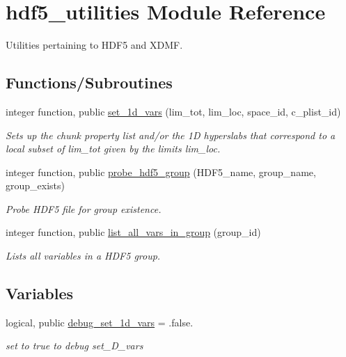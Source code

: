 \hypertarget{namespacehdf5__utilities}{}\section{hdf5\+\_\+utilities Module Reference}
\label{namespacehdf5__utilities}


Utilities pertaining to H\+D\+F5 and X\+D\+MF.  


\subsection*{Functions/\+Subroutines}
\begin{DoxyCompactItemize}
\item 
integer function, public \hyperlink{namespacehdf5__utilities_a7574320980affc30a584f7776d33a51c}{set\+\_\+1d\+\_\+vars} (lim\+\_\+tot, lim\+\_\+loc, space\+\_\+id, c\+\_\+plist\+\_\+id)
\begin{DoxyCompactList}\small\item\em Sets up the chunk property list and/or the 1D hyperslabs that correspond to a local subset of {\ttfamily lim\+\_\+tot} given by the limits {\ttfamily lim\+\_\+loc}. \end{DoxyCompactList}\item 
integer function, public \hyperlink{namespacehdf5__utilities_ae4e6c96512460a0ede8dc5b1a43681e8}{probe\+\_\+hdf5\+\_\+group} (H\+D\+F5\+\_\+name, group\+\_\+name, group\+\_\+exists)
\begin{DoxyCompactList}\small\item\em Probe H\+D\+F5 file for group existence. \end{DoxyCompactList}\item 
integer function, public \hyperlink{namespacehdf5__utilities_aa9d76166f970a7052cd0d96c8f3ee0be}{list\+\_\+all\+\_\+vars\+\_\+in\+\_\+group} (group\+\_\+id)
\begin{DoxyCompactList}\small\item\em Lists all variables in a H\+D\+F5 group. \end{DoxyCompactList}\end{DoxyCompactItemize}
\subsection*{Variables}
\begin{DoxyCompactItemize}
\item 
logical, public \hyperlink{namespacehdf5__utilities_addf084b90450dc2a0cc614f2f5ac13fc}{debug\+\_\+set\+\_\+1d\+\_\+vars} = .false.
\begin{DoxyCompactList}\small\item\em set to true to debug set\+\_\+D\+\_\+vars \end{DoxyCompactList}\end{DoxyCompactItemize}


